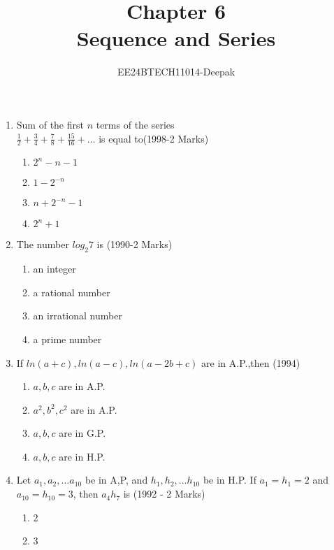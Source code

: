 \documentclass[journal,12pt,twocolumn]{IEEEtran}
\theoremstyle{remark}
\begin{document}

\vspace{3cm}

\title{Chapter 6 \\Sequence and Series}
\author{EE24BTECH11014-Deepak}
\maketitle
\newpage
\bigskip

\renewcommand{\thefigure}{\theenumi}
\renewcommand{\thetable}{\theenumi}
\begin{enumerate}
    \item Sum of the first $ n$ terms of the series \\
$ \frac{1}{2}+ \frac{3}{4}+ \frac{7}{8}+ \frac{15}{16}+ \dots $ is equal to\hfill (1998-2 Marks)
\begin{enumerate}
    \item $2^n-n-1$  
    \item $1-2^{-n}$
    \item $n+2^{-n}-1$
    \item $2^n+1$
    \end{enumerate}
\item The number ${log_2}7$ is \hfill(1990-2 Marks)
    \begin{enumerate}
        \item an integer
        \item a rational number
        \item an irrational number
        \item a prime number
    \end{enumerate}
\item If $ln(a+c),ln(a-c),ln(a-2b+c)$ are in A.P.,then \hfill (1994)
    \begin{enumerate}
        \item $a,b,c$ are in A.P.
        \item $a^2,b^2,c^2$ are in A.P.
        \item $a,b,c$ are in G.P.
        \item $a,b,c$ are in H.P.
    \end{enumerate}
\item Let ${a_1,a_2,\dots a_{10}}$ be in A,P, and ${h_1,h_2, \dots h_{10}}$ be in H.P. If ${a_1}={h_1}=2$ and ${a_{10}}={h_{10}}=3$, then ${a_4h_7}$ is \hfill(1992 - 2 Marks)
    \begin{enumerate}
        \item 2
        \item 3

\end{enumerate}
\end{enumerate}
\end{document}
